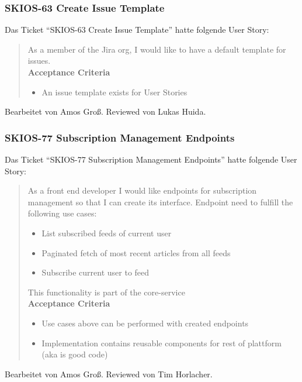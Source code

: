 \subsubsection{SKIOS-63 Create Issue Template}
Das Ticket \enquote{SKIOS-63 Create Issue Template} hatte folgende User Story:
\begin{quotation}
    As a member of the Jira org, I would like to have a default template for issues. \\
\textbf{Acceptance Criteria}
\begin{itemize}
    \item An issue template exists for User Stories
\end{itemize}
\end{quotation}
Bearbeitet von Amos Groß.
Reviewed von Lukas Huida.

\subsubsection{SKIOS-77 Subscription Management Endpoints}
Das Ticket \enquote{SKIOS-77 Subscription Management Endpoints} hatte folgende User Story:
\begin{quotation}
    As a front end developer I would like endpoints for subscription management so that I can create its interface.
    Endpoint need to fulfill the following use cases:
    \begin{itemize}
        \item List subscribed feeds of current user
        \item Paginated fetch of most recent articles from all feeds
        \item Subscribe current user to feed
    \end{itemize}

    This functionality is part of the core-service \\

\textbf{Acceptance Criteria}
\begin{itemize}
    \item Use cases above can be performed with created endpoints
    \item Implementation contains reusable components for rest of plattform (aka is good code)
\end{itemize}
\end{quotation}
Bearbeitet von Amos Groß.
Reviewed von Tim Horlacher.

